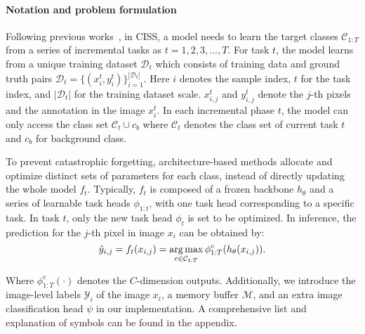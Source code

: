 \paragraph{Notation and problem formulation} Following previous works~\citep{SSUL_cha2021ssul,microseg_zhang2022mining,coinseg_zhang2023coinseg}, 
in CISS, a model needs to learn the target classes $\mathcal{C}_{1:T}$ from a series of incremental tasks as $t=1,2,3,...,T$. For task $t$, the model learns from a unique training dataset $\mathcal{D}_t$ which consists of training data and ground truth pairs $\mathcal{D}_t = \{(x_{i}^t, y_{i}^t)\}_{i=1}^{\left|\mathcal{D}_t\right|}$. Here $i$ denotes the sample index, $t$ for the task index, and $\left|\mathcal{D}_t\right|$ for the training dataset scale. 
$x_{i,j}^t$ and $y_{i, j}^t$ denote the $j$-th pixels and the annotation in the image $x_i^t$.
In each incremental phase $t$, the model can only access the class set $\mathcal{C}_t \cup c_b$ where $\mathcal{C}_t$ denotes the class set of current task $t$ and $c_b$ for background class. 

To prevent catastrophic forgetting, architecture-based methods allocate and optimize distinct sets of parameters for each class, instead of directly updating the whole model $f_t$. Typically, $f_t$ is composed of a frozen backbone $h_\theta$ and a series of learnable task heads $\phi_{1:t}$, with one task head corresponding to a specific task. 
In task $t$, only the new task head $\phi_t$ is set to be optimized.
In inference, the prediction for the $j$-th pixel in image $x_i$ can be obtained by:
\begin{equation}
    \vspace{-10pt}
    \hat{y}_{i,j} = f_{t}(x_{i,j}) = \mathop{\arg\max}\limits_{c\in\mathcal{C}_{1:T}} \phi_{1:T}^c(h_\theta(x_{i,j})).
\end{equation}

Where \(\phi_{1:T}^c(\cdot)\) denotes the $C$-dimension outputs. 
Additionally, we introduce the image-level labels $\mathcal{Y}_i$ of the image $x_i$, a memory buffer $\mathcal{M}$, and an extra image classification head $\psi$ in our implementation. A comprehensive list and explanation of symbols can be found in the appendix.


